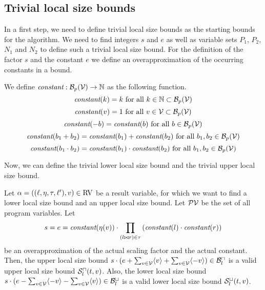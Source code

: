 \subsection{Trivial local size bounds}

In a first step, we need to define trivial local size bounds as the starting bounds for the algorithm.
We need to find integers $s$ and $e$ as well as variable sets $P_1$, $P_2$, $N_1$ and $N_2$ to define such a trivial local size bound.
For the definition of the factor $s$ and the constant $e$ we define an overapproximation of the occurring constants in a bound.

\begin{definition}
  We define $\emph{constant}: \mathcal{B}_p(\mathcal{V}) \rightarrow \mathbb{N}$ as the following function.
  \[ \emph{constant}(k) = k \text{ for all } k \in \mathbb{N} \subset \mathcal{B}_p(\mathcal{V}) \] 
  \[ \emph{constant}(v) = 1 \text{ for all } v \in \mathcal{V} \subset \mathcal{B}_p(\mathcal{V}) \] 
  \[ \emph{constant}(-b) = \emph{constant}(b) \text{ for all } b \in \mathcal{B}_p(\mathcal{V}) \] 
  \[ \emph{constant}(b_1 + b_2) = \emph{constant}(b_1) + \emph{constant}(b_2) \text{ for all } b_1, b_2 \in \mathcal{B}_p(\mathcal{V}) \] 
  \[ \emph{constant}(b_1 \cdot b_2) = \emph{constant}(b_1) \cdot \emph{constant}(b_2) \text{ for all } b_1, b_2 \in \mathcal{B}_p(\mathcal{V}) \] 
\end{definition}

Now, we can define the trivial lower local size bound and the trivial upper local size bound.

\begin{definition}
  Let $\alpha = ((\ell,\eta,\tau,\ell'),v) \in \text{RV}$ be a result variable, for which we want to find a lower local size bound and an upper local size bound.
  Let $\mathcal{PV}$ be the set of all program variables.
  Let \[ s = e = \emph{constant}(\eta(v)) \cdot \prod_{(l \bowtie r) \in \tau} \left( \emph{constant}(l) \cdot \emph{constant}(r) \right) \] be an overapproximation of the actual scaling factor and the actual constant.
  Then, the upper local size bound $s \cdot (e + \sum_{v \in \mathcal{V}} \langle v\rangle + \sum_{v \in \mathcal{V}} \langle-v\rangle) \in \mathcal{B}^\sqcap_l$ is a valid upper local size bound ${\mathcal{S}^\sqcap_l}(t,v)$.
  Also, the lower local size bound $s \cdot (e - \sum_{v \in \mathcal{V}} \langle-v\rangle - \sum_{v \in \mathcal{V}} \langle v\rangle) \in \mathcal{B}^\sqcup_l$ is a valid lower local size bound ${\mathcal{S}^\sqcup_l}(t,v)$.
\end{definition}

